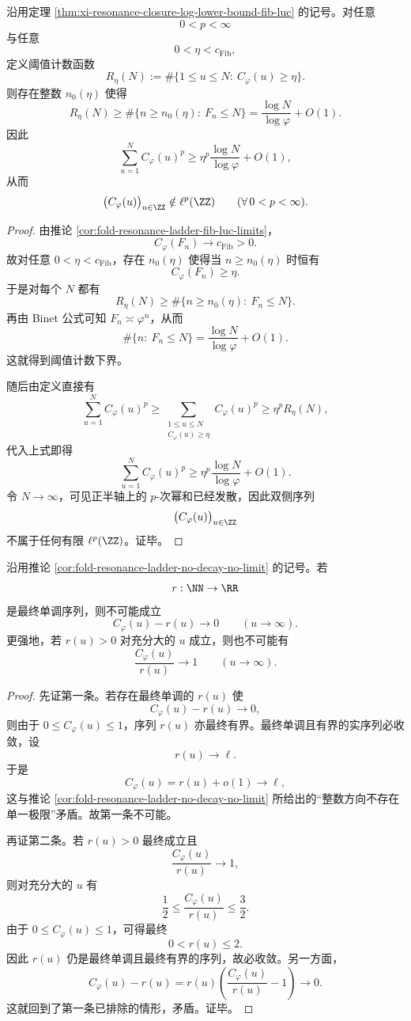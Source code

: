 \begin{theorem}\label{thm:xi-resonance-closure-no-finite-lp-summability}
沿用定理 \ref{thm:xi-resonance-closure-log-lower-bound-fib-luc} 的记号。对任意
\[
0<p<\infty
\]
与任意
\[
0<\eta<c_{\mathrm{Fib}},
\]
定义阈值计数函数
\[
R_\eta(N):=\#\{1\le u\le N:\ C_\varphi(u)\ge \eta\}.
\]
则存在整数 \(n_0(\eta)\) 使得
\[
R_\eta(N)\ge \#\{n\ge n_0(\eta):\ F_n\le N\}
=
\frac{\log N}{\log\varphi}+O(1).
\]
因此
\[
\sum_{u=1}^{N}C_\varphi(u)^p
\ge
\eta^p\frac{\log N}{\log\varphi}+O(1),
\]
从而
\[
\bigl(C_\varphi(u)\bigr)_{u\in\ZZ}\notin \ell^p(\ZZ)
\qquad
(\forall\,0<p<\infty).
\]
\end{theorem}
\begin{proof}
由推论 \ref{cor:fold-resonance-ladder-fib-luc-limits}，
\[
C_\varphi(F_n)\longrightarrow c_{\mathrm{Fib}}>0.
\]
故对任意 \(0<\eta<c_{\mathrm{Fib}}\)，存在 \(n_0(\eta)\) 使得当 \(n\ge n_0(\eta)\) 时恒有
\[
C_\varphi(F_n)\ge \eta.
\]
于是对每个 \(N\) 都有
\[
R_\eta(N)\ge \#\{n\ge n_0(\eta):\ F_n\le N\}.
\]
再由 Binet 公式可知 \(F_n\asymp \varphi^n\)，从而
\[
\#\{n:\ F_n\le N\}
=
\frac{\log N}{\log\varphi}+O(1).
\]
这就得到阈值计数下界。

随后由定义直接有
\[
\sum_{u=1}^{N}C_\varphi(u)^p
\ge
\sum_{\substack{1\le u\le N\\ C_\varphi(u)\ge \eta}}C_\varphi(u)^p
\ge
\eta^p R_\eta(N),
\]
代入上式即得
\[
\sum_{u=1}^{N}C_\varphi(u)^p
\ge
\eta^p\frac{\log N}{\log\varphi}+O(1).
\]
令 \(N\to\infty\)，可见正半轴上的 \(p\)-次幂和已经发散，因此双侧序列
\[
\bigl(C_\varphi(u)\bigr)_{u\in\ZZ}
\]
不属于任何有限 \(\ell^p(\ZZ)\)。证毕。
\end{proof}

\begin{theorem}[共振闭包常数不存在最终单调的一阶包络]\label{thm:xi-resonance-closure-no-eventually-monotone-envelope}
沿用推论 \ref{cor:fold-resonance-ladder-no-decay-no-limit} 的记号。若
\[
r:\NN\to\RR
\]
是最终单调序列，则不可能成立
\[
C_\varphi(u)-r(u)\longrightarrow 0
\qquad (u\to\infty).
\]
更强地，若 \(r(u)>0\) 对充分大的 \(u\) 成立，则也不可能有
\[
\frac{C_\varphi(u)}{r(u)}\longrightarrow 1
\qquad (u\to\infty).
\]
\end{theorem}
\begin{proof}
先证第一条。若存在最终单调的 \(r(u)\) 使
\[
C_\varphi(u)-r(u)\longrightarrow 0,
\]
则由于 \(0\le C_\varphi(u)\le 1\)，序列 \(r(u)\) 亦最终有界。最终单调且有界的实序列必收敛，设
\[
r(u)\longrightarrow \ell.
\]
于是
\[
C_\varphi(u)=r(u)+o(1)\longrightarrow \ell,
\]
这与推论 \ref{cor:fold-resonance-ladder-no-decay-no-limit} 所给出的“整数方向不存在单一极限”矛盾。故第一条不可能。

再证第二条。若 \(r(u)>0\) 最终成立且
\[
\frac{C_\varphi(u)}{r(u)}\longrightarrow 1,
\]
则对充分大的 \(u\) 有
\[
\frac12\le \frac{C_\varphi(u)}{r(u)}\le \frac32.
\]
由于 \(0\le C_\varphi(u)\le 1\)，可得最终
\[
0<r(u)\le 2.
\]
因此 \(r(u)\) 仍是最终单调且最终有界的序列，故必收敛。另一方面，
\[
C_\varphi(u)-r(u)
=
r(u)\left(\frac{C_\varphi(u)}{r(u)}-1\right)\longrightarrow 0.
\]
这就回到了第一条已排除的情形，矛盾。证毕。
\end{proof}

